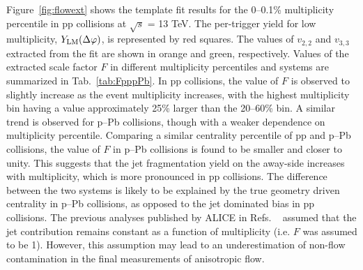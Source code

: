Figure~\ref{fig:flowext} shows the template fit results for the 0--0.1\% multiplicity percentile in pp collisions at $\sqrt{s}$ = 13 TeV. The per-trigger yield for low multiplicity, $Y_{\rm{LM}}(\Delta\varphi)$, is represented by red squares. The values of $v_{2,2}$ and $v_{3,3}$ extracted from the fit are shown in orange and green, respectively. Values of the extracted scale factor $F$ in different multiplicity percentiles and systems are summarized in Tab.~\ref{tab:FpppPb}. In pp collisions, the value of $F$ is observed to slightly increase as the event multiplicity increases, with the highest multiplicity bin having a value approximately 25\% larger than the 20--60\% bin. A similar trend is observed for p--Pb collisions, though with a weaker dependence on multiplicity percentile. Comparing a similar centrality percentile of pp and p--Pb collisions, the value of $F$ in p--Pb collisions is found to be smaller and closer to unity.
This suggests that the jet fragmentation yield on the away-side increases with multiplicity, which is more pronounced in pp collisions. The difference between the two systems is likely to be explained by the true geometry driven centrality in p--Pb collisions, as opposed to the jet dominated bias in pp collisions.
The previous analyses published by ALICE in Refs. ~\cite{ALICE:2012eyl,ALICE:2013snk} assumed that the jet contribution remains constant as a function of multiplicity (i.e. $F$ was assumed to be 1). However, this assumption may lead to an underestimation of non-flow contamination in the final measurements of anisotropic flow.
\begin{table}[h!]
\caption{The scale factor $F$ for various multiplicity percentiles in pp (top) and p--Pb (bottom) collisions. Note that there are only statistical errors from the default event and track selections.}
\centering
{}
\label{tab:FpppPb}
\end{table}

